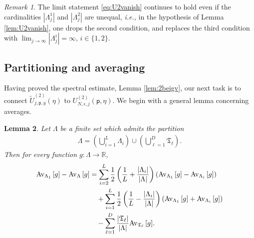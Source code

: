 \documentclass[11pt]{amsart}
\theoremstyle{plain}
\newtheorem{lemma}{Lemma}[section]
\theoremstyle{definition}
\theoremstyle{remark}
\newtheorem{remark}[lemma]{Remark}
\begin{document}
\begin{remark}
The limit statement \eqref{eq:U2vanish} continues to hold even if the cardinalities $|\Lambda_j^1|$ and $|\Lambda_j^2|$ are unequal, \emph{i.e.,} in the hypothesis of Lemma \ref{lem:U2vanish}, one drops the second condition, and replaces the third condition with $\lim_{j\to\infty} |\Lambda_j^i|=\infty$, $i\in \{1,2\}$.
\end{remark}

\subsection{Partitioning and averaging}

Having proved the spectral estimate, Lemma \ref{lem:2beigv}, our next task is to connect ${\tilde{U}^{(2)}_{{{j}},{{\mathsf{p}}},{{y}}}}(\eta)$ to ${U^{(2)}_{{{N}},{{\epsilon}},{{j}}}}({\mathsf{p}},\eta)$. We begin with a general lemma concerning averages.

\begin{lemma}
\label{lem:avg}
Let $\Lambda$ be a finite set which admits the partition
\begin{align*}
\Lambda = \left(\bigcup_{i=1}^L \Lambda_i\right) \cup \left(\bigcup_{\ell=1}^D \mathfrak{T}_\ell\right).
\end{align*}
Then for every function $g: \Lambda\to\mathbb{R}$,
\begin{align*}
{{\rm Av}_{{\Lambda_1}}\left[{{g}}\right]} - {{\rm Av}_{{\Lambda}}\left[{{g}}\right]} &=  \sum_{i=2}^L \frac{1}{2}\left(\frac{1}{L} + \frac{|\Lambda_i|}{|\Lambda|}\right) \left({{\rm Av}_{{\Lambda_1}}\left[{{g}}\right]} - {{\rm Av}_{{\Lambda_i}}\left[{{g}}\right]}\right) \\
\nonumber & \quad + \sum_{i=1}^L \frac{1}{2}\left(\frac{1}{L} - \frac{|\Lambda_i|}{|\Lambda|}\right) \left({{\rm Av}_{{\Lambda_1}}\left[{{g}}\right]} + {{\rm Av}_{{\Lambda_i}}\left[{{g}}\right]}\right) \\
\nonumber & \quad - \sum_{\ell=1}^D \frac{|\mathfrak{T}_\ell|}{|\Lambda|} {{\rm Av}_{{\mathfrak{T}_\ell}}\left[{{g}}\right]}.
\end{align*}
\end{lemma}
\end{document}
